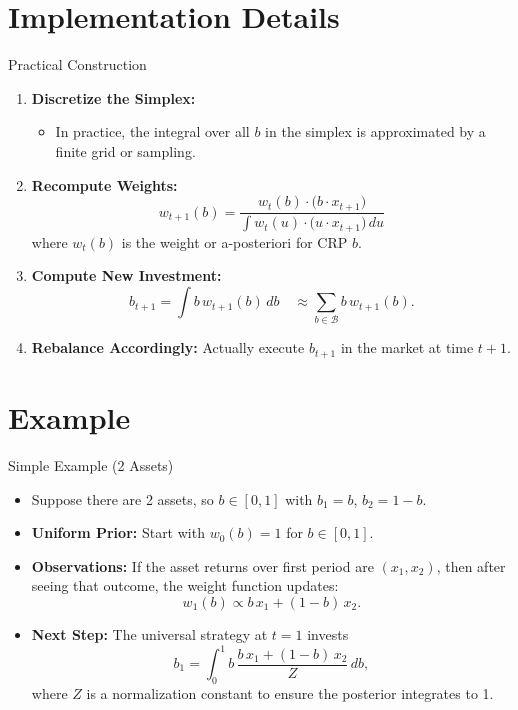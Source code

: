 \documentclass{beamer}
\begin{document}
\begin{small}
\section{Implementation Details}
\begin{frame}{Practical Construction}
  \begin{enumerate}
    \item \textbf{Discretize the Simplex:}
      \begin{itemize}
        \item In practice, the integral over all \(b\) in the simplex is approximated by a finite grid or sampling.
      \end{itemize}
    \item \textbf{Recompute Weights:}
      \[
        w_{t+1}(b) = \frac{w_t(b)\cdot \bigl(b \cdot x_{t+1}\bigr)}{\int w_t(u)\cdot \bigl(u \cdot x_{t+1}\bigr)\,du}
      \]
      where \(w_t(b)\) is the weight or a-posteriori for CRP \(b\).
    \item \textbf{Compute New Investment:}
      \[
        b_{t+1} = \int b \, w_{t+1}(b)\,db \quad \approx \sum_{b \in \mathcal{B}} b \, w_{t+1}(b).
      \]
    \item \textbf{Rebalance Accordingly:} Actually execute \(b_{t+1}\) in the market at time \(t+1\).
  \end{enumerate}
\end{frame}

\section{Example}
\begin{frame}{Simple Example (2 Assets)}
  \begin{itemize}
    \item Suppose there are 2 assets, so \(b \in [0,1]\) with \(b_1 = b\), \(b_2 = 1-b\).
    \item \textbf{Uniform Prior:} Start with \(w_0(b) = 1\) for \(b \in [0,1]\).
    \item \textbf{Observations:} If the asset returns over first period are \((x_1, x_2)\), then after seeing 
          that outcome, the weight function updates:
      \[
        w_1(b) \propto b \, x_1 + (1-b) \, x_2.
      \]
    \item \textbf{Next Step:} The universal strategy at \(t=1\) invests
      \[
        b_1 = \int_0^1 b \,\frac{b \, x_1 + (1-b) \, x_2}{Z} \, db,
      \]
      where \(Z\) is a normalization constant to ensure the posterior integrates to 1.
  \end{itemize}
\end{frame}


\end{small}
\end{document}
